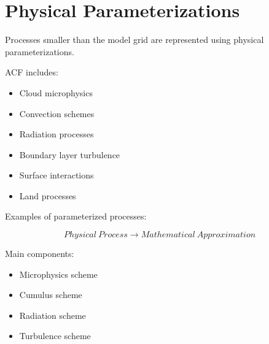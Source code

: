 \section{Physical Parameterizations}


Processes smaller than the model grid are represented using
physical parameterizations.



ACF includes:


\begin{itemize}

\item Cloud microphysics

\item Convection schemes

\item Radiation processes

\item Boundary layer turbulence

\item Surface interactions

\item Land processes

\end{itemize}



Examples of parameterized processes:


\begin{equation}
Physical\ Process
\rightarrow
Mathematical\ Approximation
\end{equation}



Main components:


\begin{itemize}

\item Microphysics scheme

\item Cumulus scheme

\item Radiation scheme

\item Turbulence scheme

\end{itemize}
